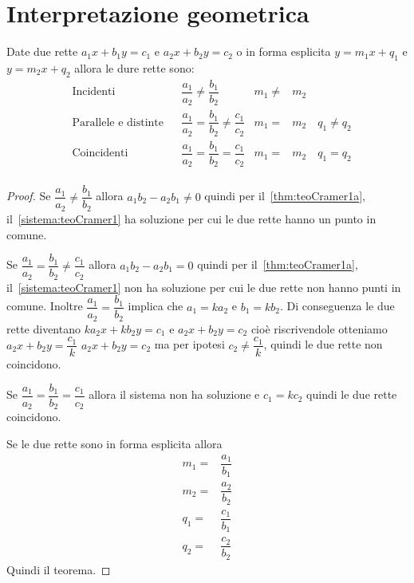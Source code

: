 \section{Interpretazione geometrica}
\begin{thm}[rette]
	Date due rette $a_1x+b_1y=c_1$ e $a_2x+b_2y=c_2$ o in forma esplicita $y=m_1x+q_1$ e $y=m_2x+q_2$ allora le dure rette sono:
\begin{align*}
&\text{Incidenti}&&\dfrac{a_1}{a_2}\neq\dfrac{b_1}{b_2}&m_1\neq& m_2\\
&\text{Parallele e distinte}&&\dfrac{a_1}{a_2}=\dfrac{b_1}{b_2}\neq\dfrac{c_1}{c_2}&m_1=& m_2\quad q_1\neq q_2\\
&\text{Coincidenti}&&\dfrac{a_1}{a_2}=\dfrac{b_1}{b_2}=\dfrac{c_1}{c_2}&m_1=& m_2\quad q_1= q_2\\
\end{align*}
\end{thm}
\begin{proof}
Se $\dfrac{a_1}{a_2}\neq\dfrac{b_1}{b_2}$ allora $a_1b_2-a_2b_1\neq 0$ quindi per il~\cref{thm:teoCramer1a}, il~\cref{sistema:teoCramer1} ha soluzione per cui le due rette hanno un punto in comune.

Se $\dfrac{a_1}{a_2}=\dfrac{b_1}{b_2}\neq\dfrac{c_1}{c_2}$ allora $a_1b_2-a_2b_1= 0$ quindi per il~\cref{thm:teoCramer1a}, il~\cref{sistema:teoCramer1} non ha soluzione per cui le due rette non hanno punti in comune. Inoltre $\dfrac{a_1}{a_2}=\dfrac{b_1}{b_2}$ implica che $a_1=ka_2$ e $b_1=kb_2$. Di conseguenza le due rette diventano $ka_2x+kb_2y=c_1$ e $a_2x+b_2y=c_2$ cioè riscrivendole otteniamo $a_2x+b_2y=\dfrac{c_1}{k}$ $a_2x+b_2y=c_2$ ma per ipotesi $c_2\neq\dfrac{c_1}{k}$, quindi le due rette non coincidono.

Se $\dfrac{a_1}{a_2}=\dfrac{b_1}{b_2}=\dfrac{c_1}{c_2}$ allora il sistema non ha soluzione e $c_1=kc_2$ quindi le  due rette coincidono.

Se le due rette sono in forma esplicita allora 
\begin{align*}
m_1=&\dfrac{a_1}{b_1}\\
m_2=&\dfrac{a_2}{b_2}\\
q_1=&\dfrac{c_1}{b_1}\\
q_2=&\dfrac{c_2}{b_2}
\end{align*} 
Quindi il teorema.
\end{proof}